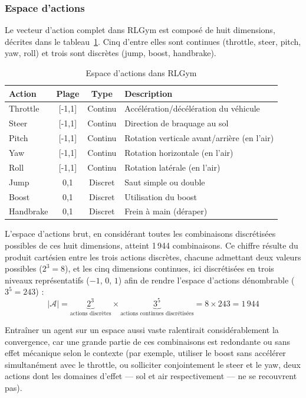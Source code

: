 \subsubsection{Espace d'actions}
\label{sec:action_space}
Le vecteur d'action complet dans RLGym est composé de huit dimensions, décrites dans le tableau~\ref{tab:action_space}. Cinq d'entre elles sont continues (throttle, steer, pitch, yaw, roll) et trois sont discrètes (jump, boost, handbrake).

\begin{table}[h]
\centering
\begin{tabular}{|l|c|c|p{5cm}|}
\hline
\textbf{Action} & \textbf{Plage} & \textbf{Type} & \textbf{Description} \\
\hline
Throttle & [-1,1] & Continu & Accélération/décélération du véhicule \\
\hline
Steer & [-1,1] & Continu & Direction de braquage au sol \\
\hline
Pitch & [-1,1] & Continu & Rotation verticale avant/arrière (en l'air) \\
\hline
Yaw & [-1,1] & Continu & Rotation horizontale (en l'air) \\
\hline
Roll & [-1,1] & Continu & Rotation latérale (en l'air) \\
\hline
Jump & {0,1} & Discret & Saut simple ou double \\
\hline
Boost & {0,1} & Discret & Utilisation du boost \\
\hline
Handbrake & {0,1} & Discret & Frein à main (déraper) \\
\hline
\end{tabular}
\caption{Espace d'actions dans RLGym \parencite{ListGameValues}}
\label{tab:action_space}
\end{table}


L'espace d'actions brut, en considérant toutes les combinaisons discrétisées possibles de ces huit dimensions, atteint 1\,944 combinaisons. Ce chiffre résulte du produit cartésien entre les trois actions discrètes, chacune admettant deux valeurs possibles ($2^3 = 8$), et les cinq dimensions continues, ici discrétisées en trois niveaux représentatifs ($-1$, $0$, $1$) afin de rendre l'espace d'actions dénombrable ($3^5 = 243$) :
\begin{equation}
    |\mathcal{A}| = \underbrace{2^3}_{\text{actions discrètes}} \times \underbrace{3^5}_{\text{actions continues discrétisées}} = 8 \times 243 = 1\,944
\end{equation}

Entraîner un agent sur un espace aussi vaste ralentirait considérablement la convergence, car une grande partie de ces combinaisons est redondante ou sans effet mécanique selon le contexte (par exemple, utiliser le boost sans accélérer simultanément avec le throttle, ou solliciter conjointement le steer et le yaw, deux actions dont les domaines d'effet — sol et air respectivement — ne se recouvrent pas).

